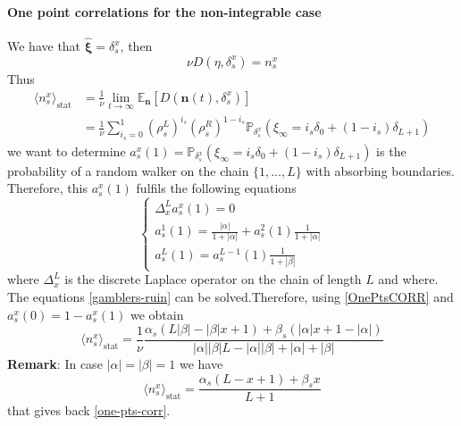 \documentclass[11pt]{article}
\numberwithin{equation}{section}
\numberwithin{equation}{subsection}
\begin{document}
\paragraph{One point correlations for the non-integrable case}
We have that $\widehat{\bm{\xi}}=\delta_{s}^{x}$, then 
\begin{equation}
	\nu D(\eta,\delta_{s}^{x})=n_{s}^{x}
\end{equation}
Thus
\begin{equation}\label{OnePtsCORR}
	\begin{split}
		\langle n_{s}^{x}\rangle_{\text{stat}}&=\frac{1}{\nu}\lim_{t\to\infty}\mathbb{E}_{\bm{n}}\left[D(\bm{n}(t),\delta_{s}^{x})\right]\\&=\frac{1}{\nu}\sum_{i_{s}=0}^{1}\left(\rho_{s}^{L}\right)^{i_{s}}\left(\rho_{s}^{R}\right)^{1-i_{s}}\mathbb{P}_{\delta_{s}^{x}}\left(\xi_{\infty}=i_{s}\delta_{0}+(1-i_{s})\delta_{L+1}\right)
	\end{split}
\end{equation}
we want to determine $a^{x}_{s}(1)=\mathbb{P}_{\delta_{s}^{x}}\left(\xi_{\infty}=i_{s}\delta_{0}+(1-i_{s})\delta_{L+1}\right)$ is the probability of a random walker on the chain $\{1,\ldots,L\}$ with absorbing boundaries. Therefore, this $a_{s}^{x}(1)$ fulfils the following equations 
\begin{equation}\label{gamblers-ruin}
	\begin{cases}
		\Delta_{x}^{L}a^{x}_{s}(1)=0\\
		a^{1}_{s}(1)=\frac{|\alpha|}{1+|\alpha|}+a^{2}_{s}(1)\frac{1}{1+|\alpha|}\\
		a^{L}_{s}(1)=a^{L-1}_{s}(1)\frac{1}{1+|\beta|}
	\end{cases}
\end{equation}
where $\Delta_{x}^{L}$ is the discrete Laplace operator on the chain of length $L$ and where. The equations \eqref{gamblers-ruin} can be solved.Therefore, using \eqref{OnePtsCORR} and $a^{x}_{s}(0)=1-a^{x}_{s}(1)$ we obtain 
\begin{equation}
	\langle n_{s}^{x}\rangle_{\text{stat}}=\frac{1}{\nu}\frac{\alpha_{s}(L|\beta|-|\beta|x+1)+\beta_{s}(|\alpha|x+1-|\alpha|)}{|\alpha||\beta|L-|\alpha||\beta|+|\alpha|+|\beta|}
\end{equation}
\textbf{Remark}: In case $|\alpha|=|\beta|=1$ we have 
\begin{equation}
	\langle n_{s}^{x}\rangle_{\text{stat}}=\frac{\alpha_{s}(L-x+1)+\beta_{s}x}{L+1}
\end{equation}
that gives back \eqref{one-pts-corr}.
\end{document}
